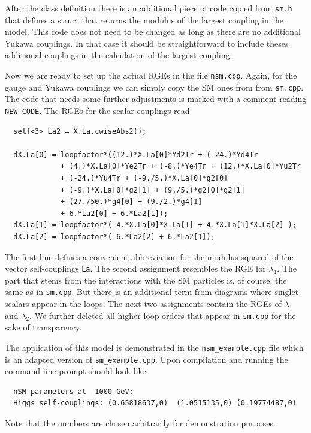 \documentclass[11pt,a4paper]{article}
\begin{document}
After the class definition there is an additional piece of code copied from \texttt{sm.h} that defines a struct that returns the modulus of the largest coupling in the model. This code does not need to be changed as long as there are no additional Yukawa couplings. In that case it should be straightforward to include theses additional couplings in the calculation of the largest coupling.

Now we are ready to set up the actual RGEs in the file \texttt{nsm.cpp}. Again, for the gauge and Yukawa couplings we can simply copy the SM ones from from \texttt{sm.cpp}. The code that needs some further adjustments is marked with a comment reading \texttt{NEW CODE}. The RGEs for the scalar couplings read
\begin{lstlisting}
  self<3> La2 = X.La.cwiseAbs2();

  dX.La[0] = loopfactor*((12.)*X.La[0]*Yd2Tr + (-24.)*Yd4Tr
             + (4.)*X.La[0]*Ye2Tr + (-8.)*Ye4Tr + (12.)*X.La[0]*Yu2Tr
             + (-24.)*Yu4Tr + (-9./5.)*X.La[0]*g2[0]
             + (-9.)*X.La[0]*g2[1] + (9./5.)*g2[0]*g2[1]
             + (27./50.)*g4[0] + (9./2.)*g4[1]
             + 6.*La2[0] + 6.*La2[1]);
  dX.La[1] = loopfactor*( 4.*X.La[0]*X.La[1] + 4.*X.La[1]*X.La[2] );
  dX.La[2] = loopfactor*( 6.*La2[2] + 6.*La2[1]);
\end{lstlisting}
The first line defines a convenient abbreviation for the modulus squared of the vector self-couplings \texttt{La}. The second assignment resembles the RGE for $\lambda_1$. The part that stems from the interactions with the SM particles is, of course, the same as in \texttt{sm.cpp}. But there is an additional term from diagrams where singlet scalars appear in the loops. The next two assignments contain the RGEs of $\lambda_1$ and $\lambda_2$. We further deleted all higher loop orders that appear in \texttt{sm.cpp} for the sake of transparency.

The application of this model is demonstrated in the \texttt{nsm\_example.cpp} file which is an adapted version of \texttt{sm\_example.cpp}. Upon compilation and running the command line prompt should look like
\begin{lstlisting}
  nSM parameters at  1000 GeV:
  Higgs self-couplings: (0.65818637,0)  (1.0515135,0) (0.19774487,0)
\end{lstlisting}
Note that the numbers are chosen arbitrarily for demonstration purposes.
\end{document}
